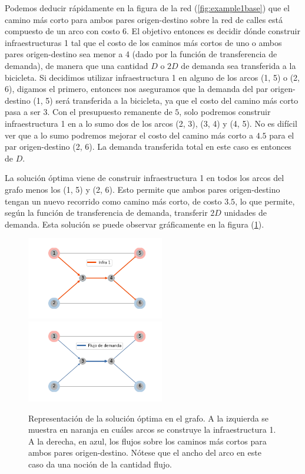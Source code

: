 \documentclass{article}
\begin{document}
  Podemos deducir rápidamente en la figura de la red (\ref{fig:example1base}) que el camino más corto para ambos pares origen-destino sobre la red de calles está compuesto de un arco con costo 6. El objetivo entonces es decidir dónde construir infraestructuras 1 tal que el costo de los caminos más cortos de uno o ambos pares origen-destino sea menor a 4 (dado por la función de transferencia de demanda), de manera que una cantidad $D$ o $2D$ de demanda sea transferida a la bicicleta. Si decidimos utilizar infraestructura 1 en alguno de los arcos (1, 5) o (2, 6), digamos el primero, entonces nos aseguramos que la demanda del par origen-destino (1, 5) será transferida a la bicicleta, ya que el costo del camino más corto pasa a ser $3$. Con el presupuesto remanente de $5$, solo podremos construir infraestructura 1 en a lo sumo dos de los arcos (2, 3), (3, 4) y (4, 5). No es difícil ver que a lo sumo podremos mejorar el costo del camino más corto a $4.5$ para el par origen-destino (2, 6). La demanda transferida total en este caso es entonces de $D$.

  La solución óptima viene de construir infraestructura 1 en todos los arcos del grafo menos los (1, 5) y (2, 6). Esto permite que ambos pares origen-destino tengan un nuevo recorrido como camino más corto, de costo $3.5$, lo que permite, según la función de transferencia de demanda, transferir $2D$ unidades de demanda. Esta solución se puede observar gráficamente en la figura (\ref{fig:example1solution}).

  \begin{figure}[h!]
    \centering
    \includegraphics[width=6cm]{../resources/example_1_infras.png}
    \includegraphics[width=6cm]{../resources/example_1_flows.png}
    \caption{Representación de la solución óptima en el grafo. A la izquierda se muestra en naranja en cuáles arcos se construye la infraestructura 1. A la derecha, en azul, los flujos sobre los caminos más cortos para ambos pares origen-destino. Nótese que el ancho del arco en este caso da una noción de la cantidad flujo.}
    \label{fig:example1solution}
  \end{figure}
\end{document}
